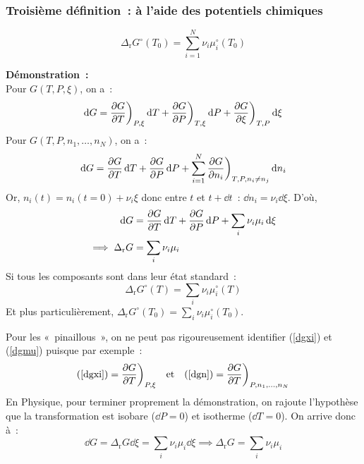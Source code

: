 \documentclass{article}
\let\oldref\ref
\renewcommand{\ref}[1]{(\oldref{#1})}
\newcommand{\Dr}{\Delta_{\mathrm{r}}}
\begin{document}
\subsubsection{Troisième définition~: à l'aide des potentiels chimiques}
\begin{tableau}
    \begin{enonce}
        $$\Dr G^\circ(T_0) = \sum_{i=1}^N \nu_i \mu_i^\circ(T_0)$$
    \end{enonce}
    \textbf{Démonstration~: }\\
    Pour $G(T,P,\xi)$, on a~:
    \begin{equation}\label{dgxi}
        \dd{G} = \pdv{G}{T}\bigg)_{P,\xi}\dd{T} + \pdv{G}{P}\bigg)_{T,\xi}\dd{P} + \pdv{G}{\xi}\bigg)_{T,P}\dd{\xi}
    \end{equation}
    Pour $G(T,P,n_1,\dots,n_N)$, on a~:
    \begin{equation}\label{dgn}
        \dd{G} = \pdv{G}{T}\dd{T} + \pdv{G}{P}\dd{P} + \sum_{i=1}^N \pdv{G}{n_i}\bigg)_{T,P,n_i\neq n_j}\dd{n_i}
    \end{equation}
    Or, $n_i(t)= n_i(t=0) + \nu_i\xi$ donc entre $t$ et $t+\dd{t}$~: $\dd{n_i} = \nu_i\dd{\xi}$. D'où,
    \begin{align}
        \dd{G} &=\pdv{G}{T} \dd{T} + \pdv{G}{P} \dd{P} + \sum_i \nu_i \mu_i \dd{\xi} \label{dgmu}\\
        \implies \Dr G &= \sum_i \nu_i \mu_i\nonumber
    \end{align}
    Si tous les composants sont dans leur état standard~:
        $$\Dr G^\circ(T) = \sum_i \nu_i \mu_i^\circ(T)$$
    Et plus particulièrement, $\Dr G^\circ(T_0) = \sum_i \nu_i \mu_i^\circ(T_0)$.
    
    \begin{remarque}[Remarque]
        Pour les «~pinaillous~», on ne peut pas rigoureusement identifier \ref{dgxi} et \ref{dgmu} puisque par exemple~:
        $$\ref{dgxi}=\pdv{G}{T}\bigg)_{P,\xi}\qq{et}\ref{dgn}=\pdv{G}{T}\bigg)_{P,n_1,\dots,n_N}$$
        \tcbline
        En Physique, pour terminer proprement la démonstration, on rajoute l'hypothèse que la transformation est isobare ($\dd{P}=0$) et isotherme ($\dd{T}=0$). On arrive donc à~:
        $$\dd{G} = \Dr G\dd{\xi} = \sum_i \nu_i \mu_i \dd{\xi} \implies \Dr G = \sum_i \nu_i \mu_i$$
    \end{remarque}
\end{tableau}
\end{document}
